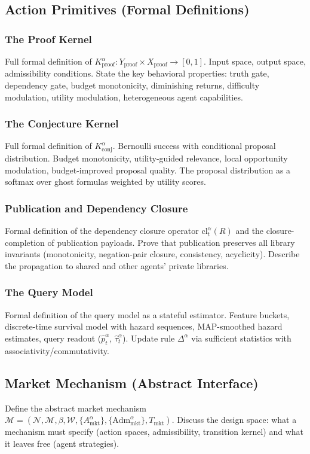 \subsection{Action Primitives (Formal Definitions)}

\subsubsection{The Proof Kernel}
Full formal definition of $K^\alpha_{\text{proof}} : Y_{\text{proof}} \times X_{\text{proof}} \to [0,1]$. Input space, output space, admissibility conditions. State the key behavioral properties: truth gate, dependency gate, budget monotonicity, diminishing returns, difficulty modulation, utility modulation, heterogeneous agent capabilities.

\subsubsection{The Conjecture Kernel}
Full formal definition of $K^\alpha_{\text{conj}}$. Bernoulli success with conditional proposal distribution. Budget monotonicity, utility-guided relevance, local opportunity modulation, budget-improved proposal quality. The proposal distribution as a softmax over ghost formulas weighted by utility scores.

\subsubsection{Publication and Dependency Closure}
Formal definition of the dependency closure operator $\text{cl}^\alpha_t(R)$ and the closure-completion of publication payloads. Prove that publication preserves all library invariants (monotonicity, negation-pair closure, consistency, acyclicity). Describe the propagation to shared and other agents' private libraries.

\subsubsection{The Query Model}
Formal definition of the query model as a stateful estimator. Feature buckets, discrete-time survival model with hazard sequences, MAP-smoothed hazard estimates, query readout ($\hat{p}^\alpha_t$, $\hat{\tau}^\alpha_t$). Update rule $\Delta^\alpha$ via sufficient statistics with associativity/commutativity.

\subsection{Market Mechanism (Abstract Interface)}
Define the abstract market mechanism $\mathcal{M} = (\mathcal{N}, \mathcal{M}, \beta, \mathcal{W}, \{A^\alpha_{\text{mkt}}\}, \{\text{Adm}^\alpha_{\text{mkt}}\}, T_{\text{mkt}})$. Discuss the design space: what a mechanism must specify (action spaces, admissibility, transition kernel) and what it leaves free (agent strategies).


